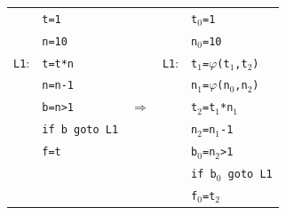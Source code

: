 \documentclass{jarticle}
\begin{document}
\begin{tabular}{llcll}
               & \verb|t=1|          &               &            & \verb|t|$_0$\verb|=1|                                        \\
               & \verb|n=10|         &               &            & \verb|n|$_0$\verb|=10|                                       \\
    \verb|L1|: & \verb|t=t*n|        &               & \verb|L1|: & \verb|t|$_1$\verb|=|$\varphi$\verb|(t|$_1$\verb|,t|$_2$\verb|)| \\
               & \verb|n=n-1|        &               &            & \verb|n|$_1$\verb|=|$\varphi$\verb|(n|$_0$\verb|,n|$_2$\verb|)| \\
               & \verb|b=n>1|        & $\Rightarrow$ &            & \verb|t|$_2$\verb|=t|$_1$\verb|*n|$_1$                       \\
               & \verb|if b goto L1| &               &            & \verb|n|$_2$\verb|=n|$_1$\verb|-1|                           \\
               & \verb|f=t|          &               &            & \verb|b|$_0$\verb|=n|$_2$\verb|>1|                           \\
               &                     &               &            & \verb|if b|$_0$\verb| goto L1|                               \\
               &                     &               &            & \verb|f|$_0$\verb|=t|$_2$                                    \\
\end{tabular}
\end{document}
